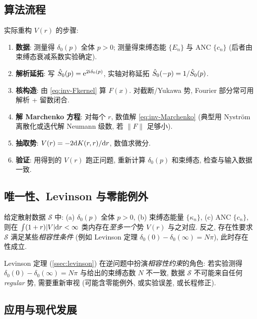 \subsection{算法流程}\label{ssec:anlyt-inverse-algo}

实际重构 $V(r)$ 的步骤:
\begin{enumerate}
  \item \textbf{数据}: 测量得 $\delta_0(p)$ 全体 $p>0$; 测量得束缚态能 $\{E_n\}$ 与 ANC $\{c_n\}$ (后者由束缚态衰减系数实验确定).
  \item \textbf{解析延拓}: 写 $\hat{S}_0(p)=\mathrm{e}^{2\mathrm{i}\delta_0(p)}$, 实轴对称延拓 $\hat{S}_0(-p)=1/\hat{S}_0(p)$.
  \item \textbf{核构造}: 由 \eqref{eq:inv-Fkernel} 算 $F(x)$. 对截断/Yukawa 势, Fourier 部分常可用解析 + 留数闭合.
  \item \textbf{解 Marchenko 方程}: 对每个 $r$, 数值解 \eqref{eq:inv-Marchenko} (典型用 Nyström 离散化或迭代解 Neumann 级数, 若 $\|F\|$ 足够小).
  \item \textbf{抽取势}: $V(r)=-2 \mathrm{d} K(r,r)/\mathrm{d} r$, 数值求微分.
  \item \textbf{验证}: 用得到的 $V(r)$ 跑正问题, 重新计算 $\delta_0(p)$ 和束缚态, 检查与输入数据一致.
\end{enumerate}

\subsection{唯一性、Levinson 与零能例外}\label{ssec:anlyt-inverse-unique}

\begin{theorem}\label{thm:inv-unique}
  给定散射数据 $\mathcal S$ 中: (a) $\delta_0(p)$ 全体 $p>0$, (b) 束缚态能量 $\{\kappa_n\}$, (c) ANC $\{c_n\}$, 则在 $\int(1+r)|V|\mathrm{d} r<\infty$ 类内存在\emph{至多一个}势 $V(r)$ 与之对应. 反之, 存在性要求 $\mathcal S$ 满足某些\emph{相容性条件} (例如 Levinson 定理 $\delta_0(0)-\delta_0(\infty)=N\pi$), 此时存在性成立.
\end{theorem}

\begin{remark}
  Levinson 定理 (\ref{ssec:levinson}) 在逆问题中扮演\emph{相容性约束}的角色: 若实验测得 $\delta_0(0)-\delta_0(\infty)=N\pi$ 与给出的束缚态数 $N$ 不一致, 数据 $\mathcal S$ 不可能来自任何 \emph{regular} 势, 需要重新审视 (可能含零能例外, 或实验误差, 或长程修正).
\end{remark}

\subsection{应用与现代发展}\label{ssec:anlyt-inverse-modern}

